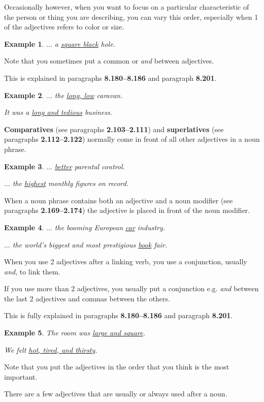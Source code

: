 \documentclass[oneside]{book}
\numberwithin{equation}{section}
\newtheorem{example}{Example}[section]
\begin{document}
Occasionally however, when you want to focus on a particular characteristic of the person or thing you are describing, you can vary this order, especially when 1 of the adjectives refers to color or size.
\begin{example}
    $\ldots$ a \underline{square black} hole.
\end{example}
Note that you sometimes put a common or \textit{and} between adjectives.

This is explained in paragraphs \textbf{8.180--8.186} and paragraph \textbf{8.201}.
\begin{example}
    $\ldots$ the \underline{long, low} caravan.
    
    It was a \underline{long and tedious} business.
\end{example}
%
\noindent{} \textbf{Comparatives} (see paragraphs \textbf{2.103--2.111}) and \textbf{superlatives} (see paragraphs \textbf{2.112--2.122}) normally come in front of all other adjectives in a noun phrase.
\begin{example}
    $\ldots$ \underline{better} parental control.
    
    $\ldots$ the \underline{highest} monthly figures on record.
\end{example}
%
\noindent{} When a noun phrase contains both an adjective and a noun modifier (see paragraphs \textbf{2.169--2.174}) the adjective is placed in front of the noun modifier.
\begin{example}
    $\ldots$ the booming European \underline{car} industry.
    
    $\ldots$ the world's biggest and most prestigious \underline{book} fair.
\end{example}
%
\noindent{} When you use 2 adjectives after a linking verb, you use a conjunction, usually \textit{and}, to link them.

If you use more than 2 adjectives, you usually put a conjunction e.g. \textit{and} between the last 2 adjectives and commas between the others.

This is fully explained in paragraphs \textbf{8.180--8.186} and paragraph \textbf{8.201}.
\begin{example}
    The room was \underline{large and square}.
    
    We felt \underline{hot, tired, and thirsty}.
\end{example}
Note that you put the adjectives in the order that you think is the most important.

%
\noindent{} There are a few adjectives that are usually or always used after a noun.
\end{document}
